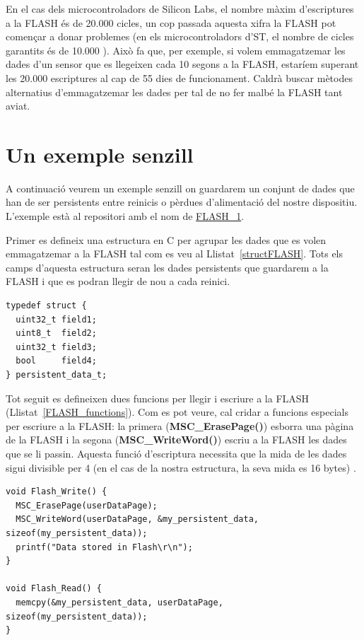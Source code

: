 En el cas dels microcontroladors de Silicon Labs, el nombre màxim d'escriptures a la \gls{FLASH} és de 20.000 cicles, un cop passada aquesta xifra la FLASH pot començar a donar problemes \cite[28]{EFM32ZG108DS} (en els microcontroladors d'ST, el nombre de cicles garantits és de 10.000 \cite[110]{STM32F4DS}). Això fa que, per exemple, si volem emmagatzemar les dades d'un sensor que es llegeixen cada 10 segons a la FLASH, estaríem superant les 20.000 escriptures al cap de 55 dies de funcionament. Caldrà buscar mètodes alternatius d'emmagatzemar les dades per tal de no fer malbé la \gls{FLASH} tant aviat.

\section{Un exemple senzill}
A continuació veurem un exemple senzill on guardarem un conjunt de dades que han de ser persistents entre reinicis o pèrdues d'alimentació del nostre dispositiu. L'exemple està al repositori amb el nom de \href{https://github.com/mariusmm/cursembedded/tree/master/Simplicity/FLASH_1}{FLASH\_1}.

Primer es defineix una estructura en C per agrupar les dades que es volen emmagatzemar a la \gls{FLASH} tal com es veu al Llistat~\ref{structFLASH}. Tots els camps d'aquesta estructura seran les dades persistents que guardarem a la FLASH i que es podran llegir de nou a cada reinici.
\begin{lstlisting}[style=customc,caption={Estructura per guardar-se a la FLASH},label=structFLASH]
typedef struct {
  uint32_t field1;
  uint8_t  field2;
  uint32_t field3;
  bool	   field4;
} persistent_data_t;
\end{lstlisting}

Tot seguit es defineixen dues funcions per llegir i escriure a la \gls{FLASH} (Llistat~\ref{FLASH_functions}). Com es pot veure, cal cridar a funcions especials per escriure a la FLASH: la primera ({\bf MSC\_ErasePage()}) esborra una pàgina de la FLASH i la segona ({\bf MSC\_WriteWord()}) escriu a la FLASH les dades que se li passin. Aquesta funció d'escriptura necessita que la mida de les dades sigui divisible per 4 (en el cas de la nostra estructura, la seva mida es 16 bytes) \cite{FLASH_EFM32}\cite{EMLIB_MSC}.

\begin{lstlisting}[style=customc,caption={Funcions per accedir a la FLASH},label=FLASH_functions]
void Flash_Write() {
  MSC_ErasePage(userDataPage);
  MSC_WriteWord(userDataPage, &my_persistent_data, sizeof(my_persistent_data));
  printf("Data stored in Flash\r\n");
}

void Flash_Read() {
  memcpy(&my_persistent_data, userDataPage, sizeof(my_persistent_data));
}
\end{lstlisting}


